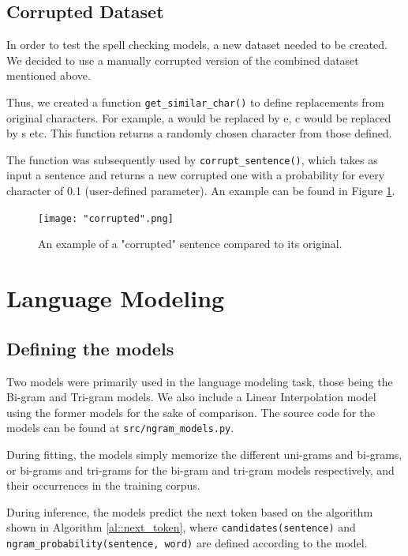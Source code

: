 \documentclass[11pt, a4paper]{article}
\begin{document}
	
	\subsection{Corrupted Dataset}
	
	In order to test the spell checking models, a new dataset needed to be created. We decided to use a manually corrupted version of the combined dataset mentioned above.
	
	Thus, we created a function \texttt{get\_similar\_char()} to define replacements from original characters. For example, a would be replaced by e, c would be replaced by s etc. This function returns a randomly chosen character from those defined.
	
	The function was subsequently used by \texttt{corrupt\_sentence()}, which takes as input a sentence and returns a new corrupted one with a probability for every character of 0.1 (user-defined parameter). An example can be found in Figure \ref{fig::corruption}.
 
	\begin{figure}
	    \centering
	    \texttt{[image: "corrupted".png]}
	    \caption{An example of a "corrupted" sentence compared to its original.}
    \label{fig::corruption}
	\end{figure}
		
	
	\section{Language Modeling}
	
	\subsection{Defining the models}
	
	Two models were primarily used in the language modeling task, those being the Bi-gram and Tri-gram models. We also include a Linear Interpolation model using the former models for the sake of comparison. The source code for the models can be found at \texttt{src/ngram\_models.py}.
	
	During fitting, the models simply memorize the different uni-grams and bi-grams, or bi-grams and tri-grams for the bi-gram and tri-gram models respectively, and their occurrences in the training corpus. 
	
	During inference, the models predict the next token based on the algorithm shown in Algorithm \ref{al::next_token}, where \texttt{candidates(sentence)} and \texttt{ngram\_probability(sentence, word)} are defined according to the model. 
	
\end{document}
